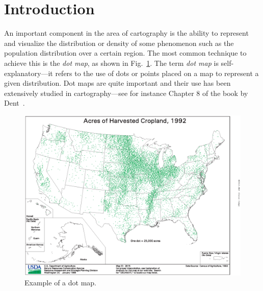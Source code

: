 \documentclass{elsart}
\begin{document}
\section{Introduction}\label{se:intro}
An important component in the area of cartography is the ability to
represent and visualize the distribution or density of some phenomenon
such as the population distribution over a certain region. The most
common technique to achieve this is the \emph{dot map}, as shown in
Fig.~\ref{fi:dotmap}.  The term \emph{dot map} is
self-explanatory---it refers to the use of dots or points placed on a
map to represent a given distribution. Dot maps are quite important
and their use has been extensively studied in cartography---see for
instance Chapter 8 of the book by Dent~\cite{d-ctmd-99}.
\begin{figure}[htb]
\begin{center}
  \includegraphics[scale=0.5]{m2815}
\end{center}
\caption{Example of a dot map.}
\label{fi:dotmap}
\end{figure}
\end{document}
